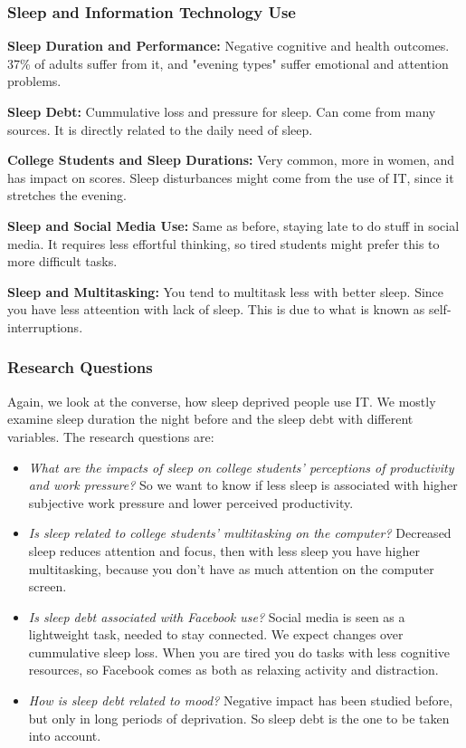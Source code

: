 \documentclass{IEEEtran}
\begin{document}
      \subsubsection{Sleep and Information Technology Use}
        \textbf{Sleep Duration and Performance:} Negative cognitive and health outcomes. 37\% of adults suffer from it, and "evening types" suffer emotional and attention problems. \par 
        \textbf{Sleep Debt:} Cummulative loss and pressure for sleep. Can come from many sources. It is directly related to the daily need of sleep. \par 
        \textbf{College Students and Sleep Durations:} Very common, more in women, and has impact on scores. Sleep disturbances might come from the use of IT, since it stretches the evening. \par 
        \textbf{Sleep and Social Media Use:} Same as before, staying late to do stuff in social media. It requires less effortful thinking, so tired students might prefer this to more difficult tasks. \par 
        \textbf{Sleep and Multitasking:} You tend to multitask less with better sleep. Since you have less atteention with lack of sleep. This is due to what is known as self-interruptions. 
      \subsubsection{Research Questions}
        Again, we look at the converse, how sleep deprived people use IT. We mostly examine sleep duration the night before and the sleep debt with different variables. The research questions are:
        \begin{itemize}
          \item \textit{What are the impacts of sleep on college students' perceptions of productivity and work pressure?} So we want to know if less sleep is associated with higher subjective work pressure and lower perceived productivity.
          \item \textit{Is sleep related to college students' multitasking on the computer?} Decreased sleep reduces attention and focus, then with less sleep you have higher multitasking, because you don't have as much attention on the computer screen. 
          \item \textit{Is sleep debt associated with Facebook use?} Social media is seen as a lightweight task, needed to stay connected. We expect changes over cummulative sleep loss. When you are tired you do tasks with less cognitive resources, so Facebook comes as both as relaxing activity and distraction.
          \item \textit{How is sleep debt related to mood?} Negative impact has been studied before, but only in long periods of deprivation. So sleep debt is the one to be taken into account.
        \end{itemize}
\end{document}
